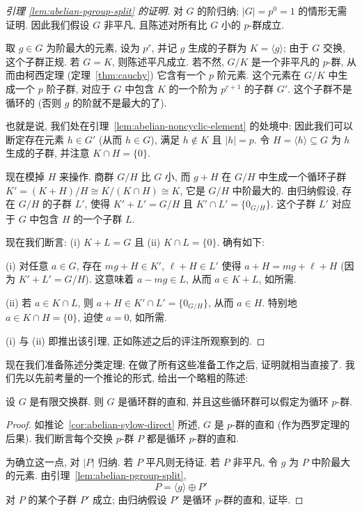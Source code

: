 \begin{proof}[引理 \ref{lem:abelian-pgroup-split} 的证明]
对 $G$ 的阶归纳; $|G| = p^0 = 1$ 的情形无需证明. 因此我们假设 $G$ 非平凡, 且陈述对所有比 $G$ 小的 $p$-群成立.

取 $g \in G$ 为阶最大的元素, 设为 $p^r$, 并记 $g$ 生成的子群为 $K = \langle g\rangle$; 由于 $G$ 交换, 这个子群正规. 若 $G = K$, 则陈述平凡成立. 若不然, $G/K$ 是一个非平凡的 $p$-群, 从而由柯西定理 (定理~\ref{thm:cauchy}) 它含有一个 $p$ 阶元素. 这个元素在 $G/K$ 中生成一个 $p$ 阶子群, 对应于 $G$ 中包含 $K$ 的一个阶为 $p^{r+1}$ 的子群 $G'$. 这个子群不是循环的 (否则 $g$ 的阶就不是最大的了).

也就是说, 我们处在引理~\ref{lem:abelian-noncyclic-element} 的处境中: 因此我们可以断定存在元素 $h \in G'$ (从而 $h \in G$), 满足 $h \notin K$ 且 $|h| = p$. 令 $H = \langle h\rangle \subseteq G$ 为 $h$ 生成的子群, 并注意 $K \cap H = \{0\}$.

现在模掉 $H$ 来操作. 商群 $G/H$ 比 $G$ 小, 而 $g + H$ 在 $G/H$ 中生成一个循环子群 $K' = (K + H)/H \cong K/(K \cap H) \cong K$, 它是 $G/H$ 中阶最大的. 由归纳假设, 存在 $G/H$ 的子群 $L'$, 使得 $K' + L' = G/H$ 且 $K' \cap L' = \{0_{G/H}\}$. 这个子群 $L'$ 对应于 $G$ 中包含 $H$ 的一个子群 $L$.

现在我们断言: (i) $K + L = G$ 且 (ii) $K \cap L = \{0\}$. 确有如下:

(i) 对任意 $a \in G$, 存在 $m g + H \in K'$, $\ell + H \in L'$ 使得 $a + H = m g + \ell + H$ (因为 $K' + L' = G/H$). 这意味着 $a - m g \in L$, 从而 $a \in K + L$, 如所需.

(ii) 若 $a \in K \cap L$, 则 $a + H \in K' \cap L' = \{0_{G/H}\}$, 从而 $a \in H$. 特别地 $a \in K \cap H = \{0\}$, 迫使 $a = 0$, 如所需.

(i) 与 (ii) 即推出该引理, 正如陈述之后的评注所观察到的.
\end{proof}

现在我们准备陈述分类定理; 在做了所有这些准备工作之后, 证明就相当直接了. 我们先以先前考量的一个推论的形式, 给出一个略粗的陈述:

\begin{corollary}
\label{cor:abelian-cyclic-sum}
设 $G$ 是有限交换群. 则 $G$ 是循环群的直和, 并且这些循环群可以假定为循环 $p$-群.
\end{corollary}

\begin{proof}
如推论~\ref{cor:abelian-sylow-direct} 所述, $G$ 是 $p$-群的直和 (作为西罗定理的后果). 我们断言每个交换 $p$-群 $P$ 都是循环 $p$-群的直和.

为确立这一点, 对 $|P|$ 归纳. 若 $P$ 平凡则无待证. 若 $P$ 非平凡, 令 $g$ 为 $P$ 中阶最大的元素. 由引理~\ref{lem:abelian-pgroup-split},
\[
P = \langle g \rangle \oplus P'
\]
对 $P$ 的某个子群 $P'$ 成立; 由归纳假设 $P'$ 是循环 $p$-群的直和, 证毕.
\end{proof}

